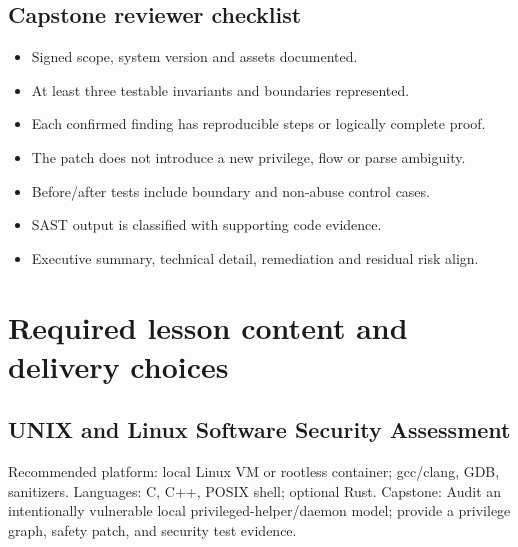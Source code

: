 \documentclass[10pt,letterpaper]{article}
\begin{document}
\subsection{Capstone reviewer checklist}
\begin{itemize}[leftmargin=*,itemsep=2pt]
\item Signed scope, system version and assets documented.
\item At least three testable invariants and boundaries represented.
\item Each confirmed finding has reproducible steps or logically complete proof.
\item The patch does not introduce a new privilege, flow or parse ambiguity.
\item Before/after tests include boundary and non-abuse control cases.
\item SAST output is classified with supporting code evidence.
\item Executive summary, technical detail, remediation and residual risk align.
\end{itemize}
\section{Required lesson content and delivery choices}
\subsection{UNIX and Linux Software Security Assessment}
Recommended platform: local Linux VM or rootless container; gcc/clang, GDB, sanitizers. Languages: C, C++, POSIX shell; optional Rust. Capstone: Audit an intentionally vulnerable local privileged-helper/daemon model; provide a privilege graph, safety patch, and security test evidence.
\end{document}
